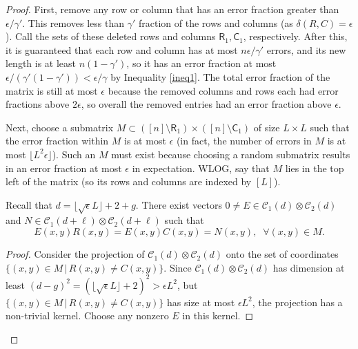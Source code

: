 \documentclass[10pt,a4paper]{amsart}
\newcommand{\Col}{\mathsf{C}}
\newcommand{\C}{\mathcal{C}}
\newcommand{\Row}{\mathsf{R}}
\renewcommand{\d}{d}
\begin{document}
\begin{proof}
First, remove any row or column that has an error fraction greater than $\epsilon/\gamma'$. This removes less than $\gamma'$ fraction of the rows and columns (as $\delta(R,C)=\epsilon$). Call the sets of these deleted rows and columns $\Row_1, \Col_1$, respectively. After this, it is guaranteed that each row and column has at most $n\epsilon/\gamma'$ errors, and its new length is at least $n(1-\gamma')$, so it has an error fraction at most $\epsilon/(\gamma'(1-\gamma')) < \epsilon/\gamma$ by Inequality \eqref{ineq1}. The total error fraction of the matrix is still at most $\epsilon$ because the removed columns and rows each had error fractions above $2\epsilon$, so overall the removed entries had an error fraction above $\epsilon$.

Next, choose a submatrix $M \subset ([n] \setminus \Row_1) \times ([n] \setminus \Col_1)$ of size $L \times L$ such that the error fraction within $M$ is at most $\epsilon$ (in fact, the number of errors in $M$ is at most $\lfloor L^2 \epsilon\rfloor$). Such an $M$ must exist because choosing a random submatrix results in an error fraction at most $\epsilon$ in expectation. WLOG, say that $M$ lies in the top left of the matrix (so its rows and columns are indexed by $[L]$).

\begin{claim}
\label{claim1}
Recall that $\d = \lfloor\sqrt{\epsilon}L\rfloor + 2 + g$. There exist vectors $0 \neq E\in \C_1(\d)\otimes \C_2(\d)$ and $N\in \C_1(\d + \ell)\otimes \C_2(\d + \ell)$ such that 
\[E(x,y)R(x,y)=E(x,y)C(x,y)=N(x,y),\;\; \forall (x,y)\in M.\]
\end{claim}

\begin{proof}
Consider the projection of $\C_1(\d)\otimes \C_2(\d)$ onto the set of coordinates $\{(x,y) \in M \,|\, R(x,y) \neq C(x,y)\}$. Since $\C_1(\d)\otimes \C_2(\d)$ has dimension at least $(\d-g)^2 = (\lfloor \sqrt{\epsilon}L\rfloor + 2)^2 > \epsilon L^2$, but $\{(x,y) \in M \,|\, R(x,y) \neq C(x,y)\}$ has size at most $\epsilon L^2$, the projection has a non-trivial kernel. Choose any nonzero $E$ in this kernel. %


\end{proof}
\end{proof}
\end{document}
